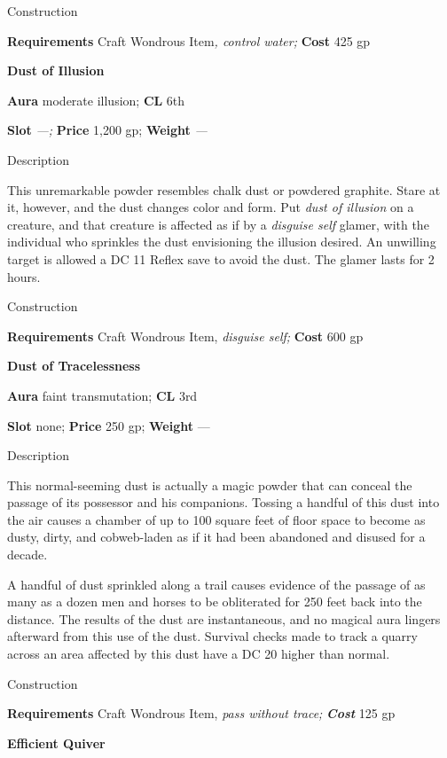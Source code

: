 Construction
				
\textbf{Requirements} Craft Wondrous Item\textit{, control water;}\textbf{ Cost }425 gp
				
\textbf{Dust of Illusion}
				
\textbf{Aura} moderate illusion; \textbf{CL} 6th
				
\textbf{Slot}\textit{ ---; }\textbf{Price} 1,200 gp; \textbf{Weight }\textit{---}
				
Description
				
This unremarkable powder resembles chalk dust or powdered graphite. Stare at it, however, and the dust changes color and form. Put \textit{dust of illusion }on a creature, and that creature is affected as if by a \textit{disguise self} glamer, with the individual who sprinkles the dust envisioning the illusion desired. An unwilling target is allowed a DC 11 Reflex save to avoid the dust. The glamer lasts for 2 hours. 
				
Construction
				
\textbf{Requirements} Craft Wondrous Item, \textit{disguise self;}\textbf{ Cost }600 gp
				
\textbf{Dust of Tracelessness}
				
\textbf{Aura} faint transmutation;\textbf{ CL }3rd
				
\textbf{Slot} none; \textbf{Price} 250 gp; \textbf{Weight }---
				
Description
				
This normal-seeming dust is actually a magic powder that can conceal the passage of its possessor and his companions. Tossing a handful of this dust into the air causes a chamber of up to 100 square feet of floor space to become as dusty, dirty, and cobweb-laden as if it had been abandoned and disused for a decade.
				
A handful of dust sprinkled along a trail causes evidence of the passage of as many as a dozen men and horses to be obliterated for 250 feet back into the distance. The results of the dust are instantaneous, and no magical aura lingers afterward from this use of the dust. Survival checks made to track a quarry across an area affected by this dust have a DC 20 higher than normal. 
				
Construction
				
\textbf{Requirements} Craft Wondrous Item,\textit{ pass without trace;}\textbf{\textit{ Cost }}125 gp
				
\textbf{Efficient Quiver}
				
